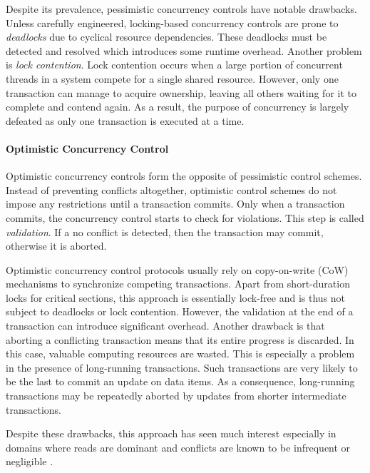 
Despite its prevalence, pessimistic concurrency controls have notable drawbacks.
Unless carefully engineered, locking-based concurrency controls are prone to
\emph{deadlocks} due to cyclical resource dependencies. These deadlocks must be
detected and resolved which introduces some runtime overhead. Another problem is
\emph{lock contention}. Lock contention occurs when a large portion of
concurrent threads in a system compete for a single shared resource. However,
only one transaction can manage to acquire ownership, leaving all others waiting
for it to complete and contend again. As a result, the purpose of concurrency is
largely defeated as only one transaction is executed at a time.

\paragraph{Optimistic Concurrency Control}

Optimistic concurrency controls form the opposite of pessimistic control
schemes. Instead of preventing conflicts altogether, optimistic control schemes
do not impose any restrictions until a transaction commits. Only when a
transaction commits, the concurrency control starts to check for violations.
This step is called \emph{validation}. If a no conflict is detected, then the
transaction may commit, otherwise it is aborted.

Optimistic concurrency control protocols usually rely on copy-on-write (CoW)
mechanisms to synchronize competing transactions. Apart from short-duration
locks for critical sections, this approach is essentially lock-free and is thus
not subject to deadlocks or lock contention. However, the validation at the end
of a transaction can introduce significant overhead. Another drawback is that
aborting a conflicting transaction means that its entire progress is discarded.
In this case, valuable computing resources are wasted. This is especially a
problem in the presence of long-running transactions. Such transactions are very
likely to be the last to commit an update on data items. As a consequence,
long-running transactions may be repeatedly aborted by updates from shorter
intermediate transactions.

Despite these drawbacks, this approach has seen much interest especially in
domains where reads are dominant and conflicts are known to be infrequent or
negligible \cite{kung1981optimistic, carey1986performance, larson2011high}.

